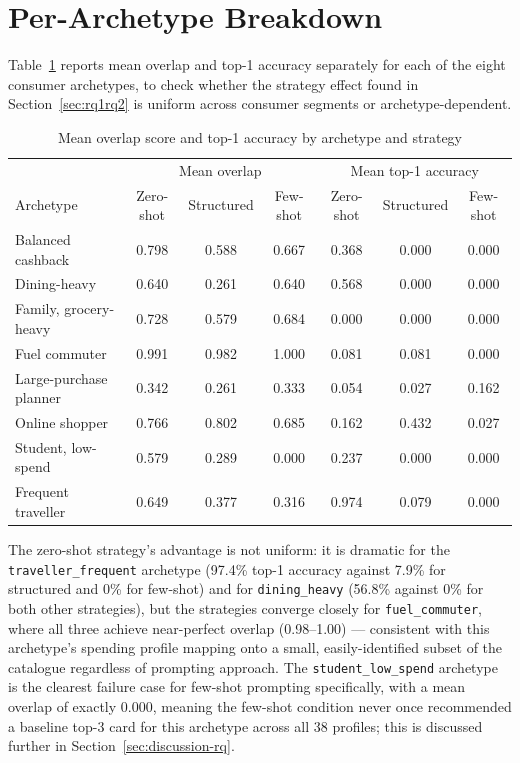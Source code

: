 \section{Per-Archetype Breakdown}
\label{sec:archetype}

Table~\ref{tab:archetype} reports mean overlap and top-1 accuracy separately for each of the eight consumer archetypes, to check whether the strategy effect found in Section~\ref{sec:rq1rq2} is uniform across consumer segments or archetype-dependent.

\begin{table}[htbp]
\centering
\caption{Mean overlap score and top-1 accuracy by archetype and strategy}
\label{tab:archetype}
\small
\begin{tabular}{lcccccc}
\toprule
& \multicolumn{3}{c}{Mean overlap} & \multicolumn{3}{c}{Mean top-1 accuracy} \\
Archetype & Zero-shot & Structured & Few-shot & Zero-shot & Structured & Few-shot \\
\midrule
Balanced cashback       & 0.798 & 0.588 & 0.667 & 0.368 & 0.000 & 0.000 \\
Dining-heavy            & 0.640 & 0.261 & 0.640 & 0.568 & 0.000 & 0.000 \\
Family, grocery-heavy   & 0.728 & 0.579 & 0.684 & 0.000 & 0.000 & 0.000 \\
Fuel commuter           & 0.991 & 0.982 & 1.000 & 0.081 & 0.081 & 0.000 \\
Large-purchase planner  & 0.342 & 0.261 & 0.333 & 0.054 & 0.027 & 0.162 \\
Online shopper          & 0.766 & 0.802 & 0.685 & 0.162 & 0.432 & 0.027 \\
Student, low-spend      & 0.579 & 0.289 & 0.000 & 0.237 & 0.000 & 0.000 \\
Frequent traveller      & 0.649 & 0.377 & 0.316 & 0.974 & 0.079 & 0.000 \\
\bottomrule
\end{tabular}
\end{table}

The zero-shot strategy's advantage is not uniform: it is dramatic for the \texttt{traveller\_frequent} archetype (97.4\% top-1 accuracy against 7.9\% for structured and 0\% for few-shot) and for \texttt{dining\_heavy} (56.8\% against 0\% for both other strategies), but the strategies converge closely for \texttt{fuel\_commuter}, where all three achieve near-perfect overlap (0.98--1.00) --- consistent with this archetype's spending profile mapping onto a small, easily-identified subset of the catalogue regardless of prompting approach. The \texttt{student\_low\_spend} archetype is the clearest failure case for few-shot prompting specifically, with a mean overlap of exactly 0.000, meaning the few-shot condition never once recommended a baseline top-3 card for this archetype across all 38 profiles; this is discussed further in Section~\ref{sec:discussion-rq}.

